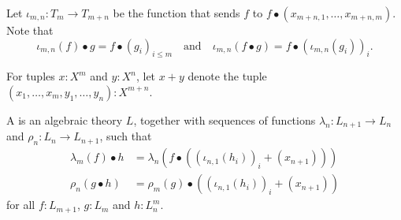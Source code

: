 Let $ \iota_{m, n} : T_m \to T_{m + n} $ be the function that sends $ f $ to $ f \bullet (x_{m + n, 1}, \dots, x_{m + n, m}) $. Note that
\[ \iota_{m, n}(f) \bullet g = f \bullet (g_i)_{i \leq m} \quad \text{and} \quad \iota_{m, n}(f \bullet g) = f \bullet (\iota_{m, n}(g_i))_i. \]

For tuples $ x : X^m $ and $ y: X^n $, let $ x + y $ denote the tuple $ (x_1, \dots, x_m, y_1, \dots, y_n) : X^{m + n} $.

\begin{definition}
  A  is an algebraic theory $ L $, together with sequences of functions $ \lambda_n: L_{n + 1} \to L_n $ and $ \rho_n: L_n \to L_{n + 1} $, such that
  \begin{align*}
    \lambda_m(f) \bullet h &= \lambda_n(f \bullet ((\iota_{n, 1}(h_i))_i + (x_{n + 1})))\\
    \rho_n(g \bullet h) &= \rho_m(g) \bullet ((\iota_{n, 1}(h_i))_i + (x_{n + 1}))
  \end{align*}
  for all $ f: L_{m + 1} $, $ g: L_m $ and $ h: L_n^m $.
\end{definition}

